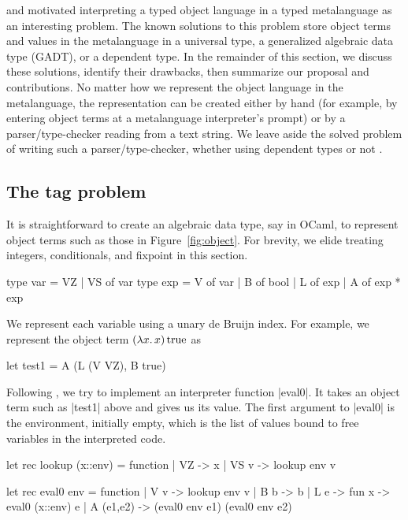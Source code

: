 \documentclass[preprint]{sigplanconf}
\newcommand{\oleg}[1]{{\it [Oleg says: #1]}}
\newcommand{\fun}[1]{\mathopen{\lambda\mathord{#1}.\,}}
\newcommand{\True}{\mathinner{\mathrm{true}}}
\begin{document}
 and \citet{xi-guarded} motivated interpreting
a typed object language in a typed metalanguage as an interesting
problem.  The known solutions to this problem store object terms and
values in the metalanguage in a universal type, a generalized algebraic
data type (GADT), or a dependent type.  In the remainder of this section,
we discuss these solutions, identify their drawbacks, then summarize our
proposal and contributions.  
No matter how we represent the object language in the
metalanguage, the representation can be created either by hand (for example, by
entering object terms at a metalanguage interpreter's prompt) or
by a parser\slash type\hyp checker reading from a text string.
We leave aside the solved problem of writing such a parser\slash type\hyp checker,
whether using dependent types \citep{WalidICFP02} or not \citep{baars-typing}.

\subsection{The tag problem}\label{tagproblem}


It is straightforward to create an algebraic data type, say in OCaml, to
represent object terms such as those in Figure~\ref{fig:object}.
For brevity, we elide treating integers, conditionals, and fixpoint in
this section.
\begin{code}
type var = VZ | VS of var
type exp = V of var | B of bool
         | L of exp | A of exp * exp
\end{code}
We represent each variable using a unary de Bruijn index.
For example, we represent the object term $(\fun{x}x)\True$ as
\begin{code}
let test1 = A (L (V VZ), B true)
\end{code}

Following \citet{WalidICFP02},
we try to implement an interpreter function |eval0|. It takes
an object term such as |test1| above and gives us its value.
The first argument to |eval0| is the environment, initially empty,
which is the list of values bound to free variables in the
interpreted code.
\begin{code}
let rec lookup (x::env) = function
| VZ   -> x
| VS v -> lookup env v

let rec eval0 env = function
| V v       -> lookup env v
| B b       -> b 
| L e       -> fun x -> eval0 (x::env) e
| A (e1,e2) -> (eval0 env e1) (eval0 env e2) 
\end{code}
\end{document}
